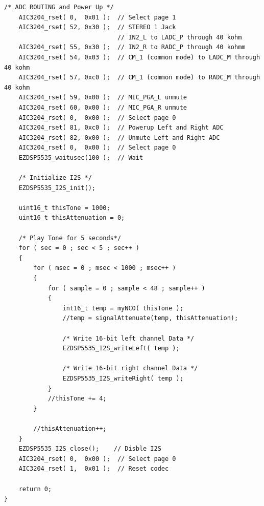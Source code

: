 \documentclass[11pt,pdftex,portrait,letterpaper]{article}
\begin{document}
\begin{lstlisting}[caption={aic3204 tone headphone}, label=l:aic3204]
    /* ADC ROUTING and Power Up */
    AIC3204_rset( 0,  0x01 );  // Select page 1
    AIC3204_rset( 52, 0x30 );  // STEREO 1 Jack
                               // IN2_L to LADC_P through 40 kohm
    AIC3204_rset( 55, 0x30 );  // IN2_R to RADC_P through 40 kohmm
    AIC3204_rset( 54, 0x03 );  // CM_1 (common mode) to LADC_M through 40 kohm
    AIC3204_rset( 57, 0xc0 );  // CM_1 (common mode) to RADC_M through 40 kohm
    AIC3204_rset( 59, 0x00 );  // MIC_PGA_L unmute
    AIC3204_rset( 60, 0x00 );  // MIC_PGA_R unmute
    AIC3204_rset( 0,  0x00 );  // Select page 0
    AIC3204_rset( 81, 0xc0 );  // Powerup Left and Right ADC
    AIC3204_rset( 82, 0x00 );  // Unmute Left and Right ADC
    AIC3204_rset( 0,  0x00 );  // Select page 0 
    EZDSP5535_waitusec(100 );  // Wait

    /* Initialize I2S */
    EZDSP5535_I2S_init();

    uint16_t thisTone = 1000;
    uint16_t thisAttenuation = 0;
  
    /* Play Tone for 5 seconds*/
    for ( sec = 0 ; sec < 5 ; sec++ )
    {
        for ( msec = 0 ; msec < 1000 ; msec++ )
        {
            for ( sample = 0 ; sample < 48 ; sample++ )
            {
            	int16_t temp = myNCO( thisTone );
            	//temp = signalAttenuate(temp, thisAttenuation);

                /* Write 16-bit left channel Data */
                EZDSP5535_I2S_writeLeft( temp );
                
                /* Write 16-bit right channel Data */
                EZDSP5535_I2S_writeRight( temp );
            }
            //thisTone += 4;
        }

        //thisAttenuation++;
    }
    EZDSP5535_I2S_close();    // Disble I2S
    AIC3204_rset( 0,  0x00 );  // Select page 0
    AIC3204_rset( 1,  0x01 );  // Reset codec
    
    return 0;
}
\end{lstlisting}

\pagebreak
\end{document}

